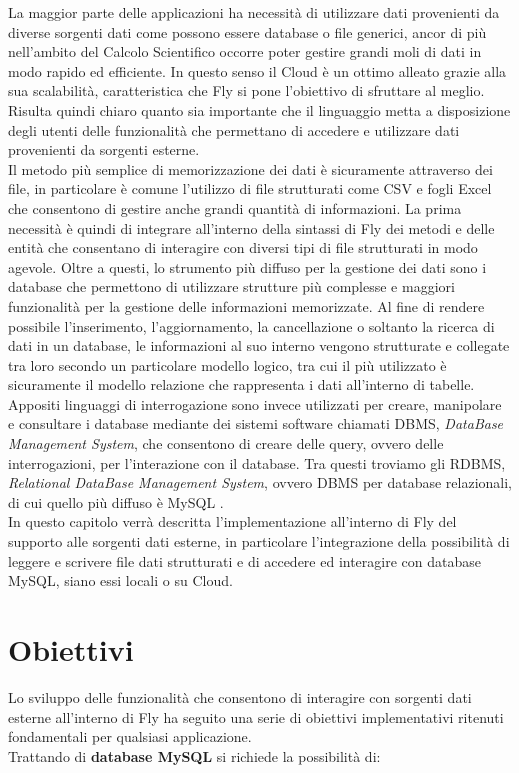La maggior parte delle applicazioni ha necessità di utilizzare dati provenienti da diverse sorgenti dati come possono essere database o file generici, ancor di più nell'ambito del Calcolo Scientifico occorre poter gestire grandi moli di dati in modo rapido ed efficiente. In questo senso il Cloud è un ottimo alleato grazie alla sua scalabilità, caratteristica che Fly si pone l'obiettivo di sfruttare al meglio. Risulta quindi chiaro quanto sia importante che il linguaggio metta a disposizione degli utenti delle funzionalità che permettano di accedere e utilizzare dati provenienti da sorgenti esterne.\\
Il metodo più semplice di memorizzazione dei dati è sicuramente attraverso dei file, in particolare è comune l'utilizzo di file strutturati come CSV e fogli Excel che consentono di gestire anche grandi quantità di informazioni. La prima necessità è quindi di integrare all'interno della sintassi di Fly dei metodi e delle entità che consentano di interagire con diversi tipi di file strutturati in modo agevole. Oltre a questi, lo strumento più diffuso per la gestione dei dati sono i database che permettono di utilizzare strutture più complesse e maggiori funzionalità per la gestione delle informazioni memorizzate. Al fine di rendere possibile l'inserimento, l'aggiornamento, la cancellazione o soltanto la ricerca di dati in un database, le informazioni al suo interno vengono strutturate e collegate tra loro secondo un particolare modello logico, tra cui il più utilizzato è sicuramente il modello relazione che rappresenta i dati all'interno di tabelle. Appositi linguaggi di interrogazione sono invece utilizzati per creare, manipolare e consultare i database mediante dei sistemi software chiamati DBMS, \textit{DataBase Management System}, che consentono di creare delle query, ovvero delle interrogazioni, per l'interazione con il database. Tra questi troviamo gli RDBMS, \textit{Relational DataBase Management System}, ovvero DBMS per database relazionali, di cui quello più diffuso è MySQL \cite{mysql}.\\
In questo capitolo verrà descritta l'implementazione all'interno di Fly del supporto alle sorgenti dati esterne, in particolare l'integrazione della possibilità di leggere e scrivere file dati strutturati e di accedere ed interagire con database MySQL, siano essi locali o su Cloud.

\section{Obiettivi}
Lo sviluppo delle funzionalità che consentono di interagire con sorgenti dati esterne all'interno di Fly ha seguito una serie di obiettivi implementativi ritenuti fondamentali per qualsiasi applicazione.\\
Trattando di \textbf{database MySQL} si richiede la possibilità di:

